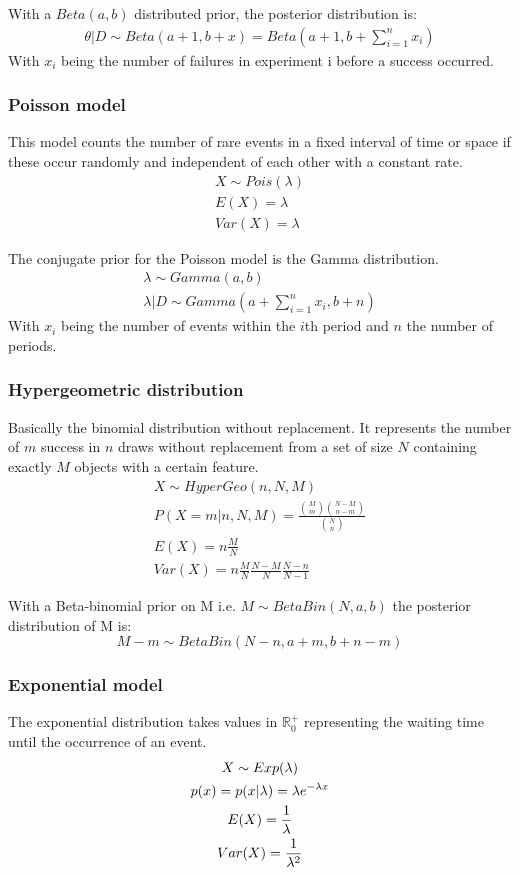 With a $Beta(a,b)$ distributed prior, the posterior distribution is:
\begin{gather*}
\theta|D\sim Beta(a+1, b+x) = Beta(a+1, b+\sum_{i=1}^{n}x_i)
\end{gather*}
With $x_i$ being the number of failures in experiment i before a success occurred.

\subsubsection{Poisson model}
This model counts the number of rare events in a fixed interval of time or space if these occur randomly and independent of each other with a constant rate.
\begin{gather*}
X\sim Pois(\lambda)\\
E(X) = \lambda\\
Var(X) = \lambda
\end{gather*}

The conjugate prior for the Poisson model is the Gamma distribution.
\begin{gather*}
\lambda \sim Gamma(a, b)\\
\lambda|D \sim Gamma(a+\sum_{i=1}^{n}x_i, b+n)
\end{gather*}
With $x_i$ being the number of events within the $i$th period and $n$ the number of periods.

\subsubsection{Hypergeometric distribution}
Basically the binomial distribution without replacement. It represents the number of $m$ success in $n$ draws without replacement from a set of size $N$ containing exactly $M$ objects with a certain feature.
\begin{gather*}
X\sim HyperGeo(n,N,M)\\
P(X=m|n, N, M) = \frac{{{M}\choose{m}}{{N-M}\choose{n-m}}}{{N\choose n}}\\
E(X) = n\frac{M}{N}\\
Var(X) = n\frac{M}{N}\frac{N-M}{N}\frac{N-n}{N-1}
\end{gather*}

With a Beta-binomial prior on M i.e. $M\sim BetaBin(N, a, b)$ the posterior distribution of M is:
\begin{equation*}
M-m\sim BetaBin(N-n, a+m, b+n-m)
\end{equation*}

\subsubsection{Exponential model}
The exponential distribution takes values in $\mathbb{R}_0^+$ representing the waiting time until the occurrence of an event.
\begin{gather*}
X\sim Exp(\lambda)\\
p(x) = p(x|\lambda) = \lambda e^{-\lambda x}\\
E(X) = {1\over\lambda}\\
Var(X) = {1\over\lambda^2}
\end{gather*}

